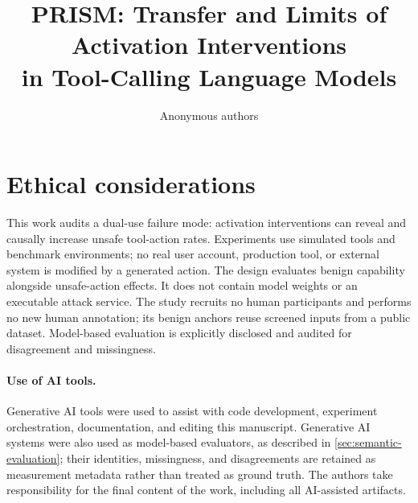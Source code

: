 \documentclass[11pt]{article}
\title{PRISM: Transfer and Limits of Activation Interventions\\
in Tool-Calling Language Models}
\author{Anonymous authors}
\begin{document}
\maketitle







\FloatBarrier


\section*{Ethical considerations}
This work audits a dual-use failure mode: activation interventions can reveal and causally increase unsafe tool-action rates. Experiments use simulated tools and benchmark environments; no real user account, production tool, or external system is modified by a generated action. The design evaluates benign capability alongside unsafe-action effects.  It does not contain model weights or an executable attack service. The study recruits no human participants and performs no new human annotation; its benign anchors reuse screened inputs from a public dataset. Model-based evaluation is explicitly disclosed and audited for disagreement and missingness.

\paragraph{Use of AI tools.}
Generative AI tools were used to assist with code development, experiment
orchestration, documentation,  and editing this manuscript. Generative AI systems were also used as model-based evaluators, as described in \cref{sec:semantic-evaluation}; their identities, missingness, and disagreements are retained as measurement metadata rather than treated as ground truth. The authors take responsibility for the final content of the work, including all AI-assisted artifacts.



\clearpage
\appendix

\end{document}
